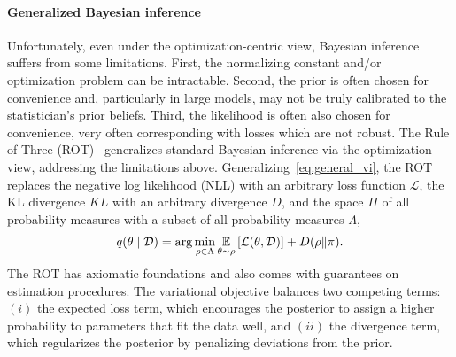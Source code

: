 \paragraph{Generalized Bayesian inference}
Unfortunately, even under the optimization-centric view, Bayesian inference suffers from some limitations.
First, the normalizing constant and/or optimization problem can be intractable.
Second, the prior is often chosen for convenience and, particularly in large models, may not be truly calibrated to the statistician's prior beliefs.
Third, the likelihood is often also chosen for convenience, very often corresponding with losses which are not robust.
The Rule of Three (ROT)~\citep{knoblauch2022optimization} generalizes standard Bayesian inference via the optimization view, addressing the limitations above. %
Generalizing~\eqref{eq:general_vi}, the ROT replaces the negative log likelihood (NLL) with an arbitrary loss function $\mathcal{L}$, the KL divergence $KL$ with an arbitrary divergence $D$, and  the space $\Pi$ of all probability measures with a subset of all probability measures $\Lambda$,
\begin{align}
	q(\theta \mid \mathcal{D}) = \arg\min_{\rho \in \Lambda} \underset{\theta \sim \rho}{\mathbb{E}}\left[\mathcal{L}(\theta, \mathcal{D})\right] + D(\rho \Vert \pi). \label{eq:rot}
\end{align} 
The ROT has axiomatic foundations and also comes with guarantees on estimation procedures. 
The variational objective balances two competing terms: $(i)$ the expected loss term, which encourages the posterior to assign a higher probability to parameters that fit the data well, and $(ii)$ the divergence term, which regularizes the posterior by penalizing deviations from the prior.

